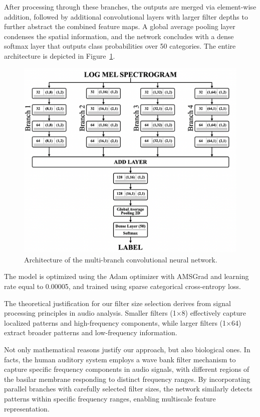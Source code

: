 \documentclass{article}
\begin{document}
\begin{sloppy}
After processing through these branches, the outputs are merged via element-wise addition, followed by additional convolutional
layers with larger filter depths to further abstract the combined feature maps. 
A global average pooling layer condenses the
spatial information, and the network concludes with a dense softmax layer that outputs class probabilities over 50 categories.
The entire architecture is depicted in Figure~\ref{fig:Entire_architecture}.
\begin{figure}[ht]
  \centering
  \centerline{\includegraphics[width=\columnwidth]{Entire_architecture.png}}
  \caption{Architecture of the multi-branch convolutional neural network.}
  \label{fig:Entire_architecture}
\end{figure}

The model is optimized using the Adam optimizer with AMSGrad and learning rate equal to 0.00005, and trained using sparse categorical cross-entropy loss.

The theoretical justification for our filter size selection derives from signal processing
principles in audio analysis. Smaller filters (1×8) effectively capture localized
patterns and high-frequency components, while larger filters (1×64) extract broader
patterns and low-frequency information.

Not only mathematical reasons justify our approach, but also biological ones. In facts, the human auditory system employs a wave bank filter mechanism
to capture specific frequency components in audio signals, with different regions of the
basilar membrane responding to distinct frequency ranges. By incorporating parallel
branches with carefully selected filter sizes, the network similarly detects patterns within specific frequency ranges, enabling multiscale
feature representation.

\end{sloppy}
\end{document}
